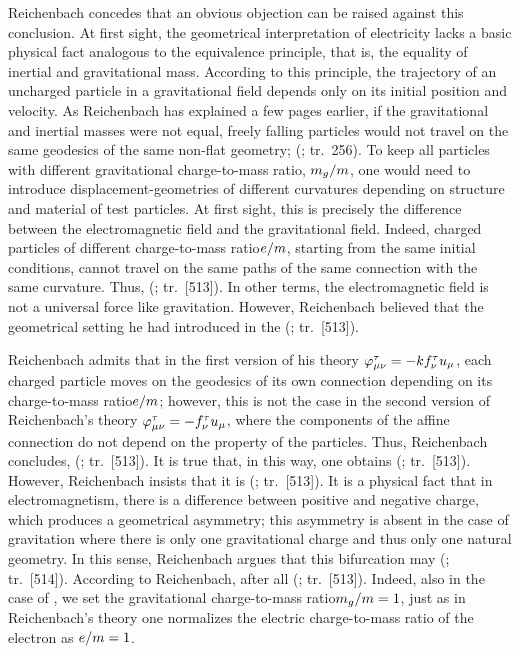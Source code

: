 \documentclass[final]{article}
\newcommand{\ctmr}{charge-to-mass ratio\xspace}
\newcommand{\ctmrf}{\ensuremath{\hfrac{e}{m}}\xspace}
\newcommand{\ctmrg}{\ensuremath{\hfrac{m_g}{m}}\xspace}
\newcommand{\RTo}{\ensuremath{\varphi\tmn=-k f^\tau_\nu u_\mu}\xspace}
\newcommand{\RTt}{\ensuremath{\varphi\tmn=-f^\tau_\nu u_\mu}\xspace}
\renewcommand{\me}{;~m.e.{}}
\renewcommand{\rzlp}[2]{(\cite[#1]{Reichenbach1928}; tr.\ #2)\xspace}
\renewcommand{\rzlap}[2]{(\cite[#1]{Reichenbach1928}; tr.\ [#2])\xspace}
\begin{document}
Reichenbach concedes that an obvious objection can be raised against this conclusion. At first sight, the geometrical interpretation of electricity lacks a basic physical fact analogous to the equivalence principle, that is, the equality of inertial and gravitational mass. According to this principle, the trajectory of an uncharged particle in a gravitational field depends only on its initial position and velocity. As Reichenbach has explained a few pages earlier, if the gravitational and inertial masses were not equal, freely falling particles would not travel on the same geodesics of the same non-flat \spti geometry;  \rzlp{293\me}{256}. To keep all particles with different gravitational \ctmr, \ctmrg, one would need to introduce displacement-geometries of different curvatures depending on structure and material of test particles. At first sight, this is precisely the difference between the electromagnetic field and the gravitational field. Indeed, charged particles of different \ctmr \ctmrf, starting from the same initial conditions, cannot travel on the same paths of the same connection with the same curvature. Thus,  \rzlap{367}{513}. In other terms, the electromagnetic field is not a universal force like gravitation. However, Reichenbach believed that the geometrical setting he had introduced in the \Ap {} \rzlap{367\me}{513}. 

Reichenbach admits that in the first version of his theory \RTo, each charged particle moves on the geodesics of its own connection depending on its \ctmr \ctmrf; however, this is not the case in the second version of Reichenbach's theory \RTt, where the components of the affine connection do not depend on the property of the particles. Thus, Reichenbach concludes,  \rzlap{367}{513}. It is true that, in this way, one obtains  \rzlap{367}{513}. However, Reichenbach insists that it is  \rzlap{367}{513}. It is a physical fact that in electromagnetism, there is a difference between positive and negative charge, which produces a geometrical asymmetry; this asymmetry is absent in the case of gravitation where there is only one gravitational charge and thus only one natural geometry. In this sense, Reichenbach argues that this bifurcation may  \rzlap{367\me}{514}. According to Reichenbach, after all \rzlap{367}{513}. Indeed, also in the case of \gr, we set the gravitational \ctmr $\ctmrg=1$, just as in Reichenbach's theory one normalizes the electric \ctmr of the electron as $\ctmrf = 1$.
\end{document}
